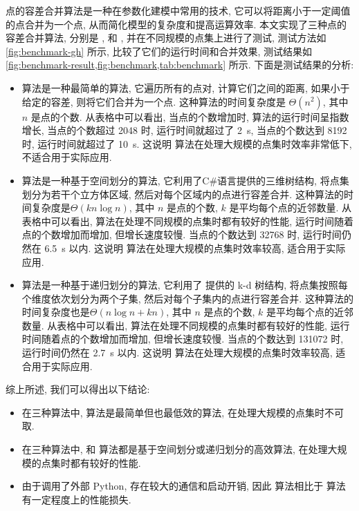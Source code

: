 点的容差合并算法是一种在参数化建模中常用的技术, 它可以将距离小于一定阈值的点合并为一个点, 从而简化模型的复杂度和提高运算效率.
本文实现了三种点的容差合并算法, 分别是 ,  和 , 并在不同规模的点集上进行了测试, 测试方法如 \cref{fig:benchmark-gh} 所示, 比较了它们的运行时间和合并效果, 测试结果如 \cref{fig:benchmark-result,fig:benchmark,tab:benchmark} 所示.
下面是测试结果的分析:
\begin{itemize}
  \item {} 算法是一种最简单的算法, 它遍历所有的点对, 计算它们之间的距离, 如果小于给定的容差, 则将它们合并为一个点.
        这种算法的时间复杂度是 $\Theta(n^2)$, 其中 $n$ 是点的个数.
        从表格中可以看出, 当点的个数增加时,   算法的运行时间呈指数增长, 当点的个数超过 \num{2048} 时, 运行时间就超过了 \SI{2}{\second}, 当点的个数达到 \num{8192} 时, 运行时间就超过了 \SI{10}{\second}.
        这说明  算法在处理大规模的点集时效率非常低下, 不适合用于实际应用.
  \item {} 算法是一种基于空间划分的算法, 它利用了C\#语言提供的三维树结构, 将点集划分为若干个立方体区域, 然后对每个区域内的点进行容差合并.
        这种算法的时间复杂度是$\Theta(k n \log n)$, 其中 $n$ 是点的个数, $k$ 是平均每个点的近邻数量.
        从表格中可以看出,  算法在处理不同规模的点集时都有较好的性能, 运行时间随着点的个数增加而增加, 但增长速度较慢.
        当点的个数达到 \num{32768} 时, 运行时间仍然在 \SI{6.5}{\second} 以内.
        这说明  算法在处理大规模的点集时效率较高, 适合用于实际应用.
  \item {} 算法是一种基于递归划分的算法, 它利用了  提供的 k-d 树结构, 将点集按照每个维度依次划分为两个子集, 然后对每个子集内的点进行容差合并.
        这种算法的时间复杂度也是$\Theta(n \log{n} + k n)$, 其中 $n$ 是点的个数, $k$ 是平均每个点的近邻数量.
        从表格中可以看出,  算法在处理不同规模的点集时都有较好的性能, 运行时间随着点的个数增加而增加, 但增长速度较慢.
        当点的个数达到 \num{131072} 时, 运行时间仍然在 \SI{2.7}{\second} 以内.
        这说明  算法在处理大规模的点集时效率较高, 适合用于实际应用.
\end{itemize}

综上所述, 我们可以得出以下结论:
\begin{itemize}
  \item 在三种算法中,  算法是最简单但也最低效的算法, 在处理大规模的点集时不可取.
  \item 在三种算法中,  和  算法都是基于空间划分或递归划分的高效算法, 在处理大规模的点集时都有较好的性能.
  \item 由于调用了外部 Python, 存在较大的通信和启动开销, 因此  算法相比于  算法有一定程度上的性能损失.
\end{itemize}

